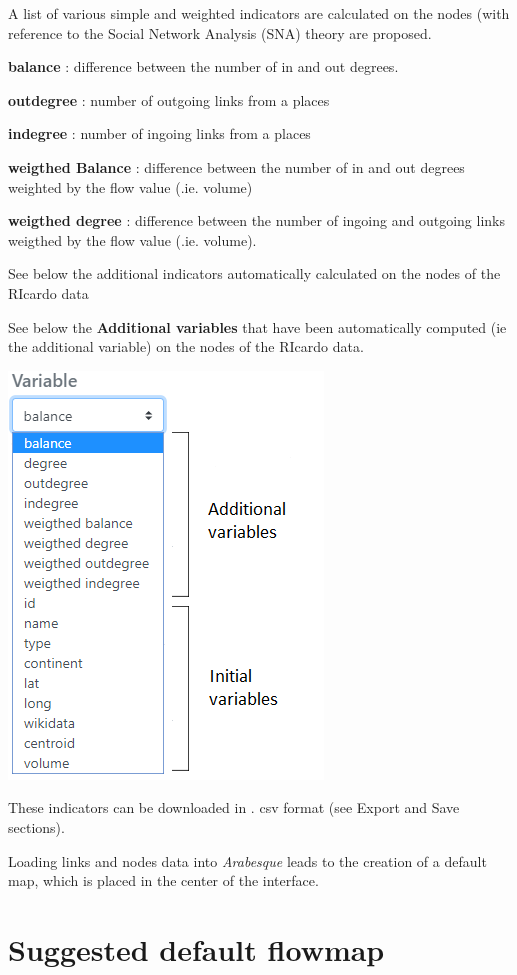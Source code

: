 \documentclass[
  letterpaper,
  DIV=11,
  numbers=noendperiod]{scrreprt}
\begin{document}
A list of various simple and weighted indicators are calculated on the
nodes (with reference to the Social Network Analysis (SNA) theory are
proposed.

\textbf{balance} : difference between the number of in and out degrees.

\textbf{outdegree} : number of outgoing links from a places

\textbf{indegree} : number of ingoing links from a places

\textbf{weigthed Balance} : difference between the number of in and out
degrees weighted by the flow value (.ie. volume)

\textbf{weigthed degree} : difference between the number of ingoing and
outgoing links weigthed by the flow value (.ie. volume).

See below the additional indicators automatically calculated on the
nodes of the RIcardo data

See below the \textbf{Additional variables} that have been automatically
computed (ie the additional variable) on the nodes of the RIcardo data.

\includegraphics{images/import_indic.png}

These indicators can be downloaded in . csv format (see Export and Save
sections).

Loading links and nodes data into \emph{Arabesque} leads to the creation
of a default map, which is placed in the center of the interface.

\section{Suggested default flowmap}\label{suggested-default-flowmap}
\end{document}
